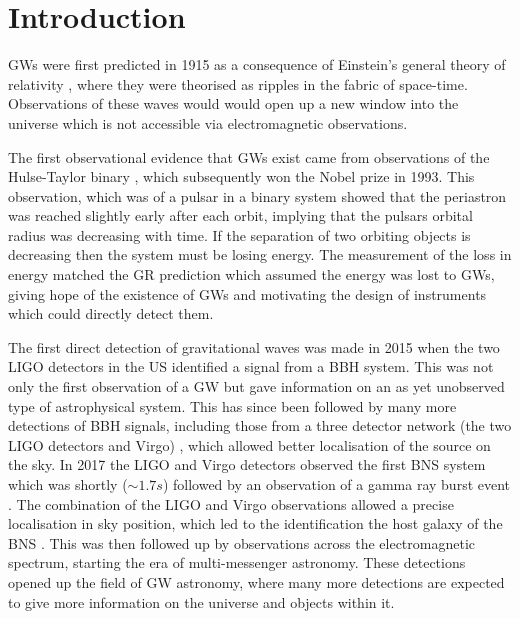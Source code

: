 \chapter{\label{intro}Introduction}


\Glspl{GW} were first predicted in 1915 as a consequence of Einstein's general
theory of relativity \citep{einstein2005GrundlageAllgemeinen}, where they were
theorised as ripples in the fabric of space-time.  Observations of these waves would would open up a new window into the universe which is not accessible via electromagnetic observations.  

The first observational evidence that \glspl{GW} exist came from observations of the Hulse-Taylor
binary \citep{weisberg1981GravitationalWaves,weisberg2004RelativisticBinary}, which subsequently won the Nobel prize in 1993.
This observation, which was of a pulsar in a binary system showed that the periastron was
reached slightly early after each orbit, implying that the pulsars orbital radius was
decreasing with time.  If the separation of two orbiting objects is decreasing
then the system must be losing energy.  The measurement of the loss in energy matched the \gls{GR}
prediction which assumed the energy was lost to \glspl{GW}, giving hope of
the existence of \glspl{GW} and motivating the design of instruments
which could directly detect them.

The first direct detection of gravitational
waves was made in 2015 when the two \gls{LIGO} detectors in the US
\citep{abbott2016ObservationGravitational} identified a signal from a \gls{BBH}
system.  This was not only the first observation of a \gls{GW} but gave
information on an as yet unobserved type of astrophysical
system.  This has since been followed by many more detections of \gls{BBH}
signals, including those from a three detector network (the two \gls{LIGO} detectors and Virgo)
\citep{abbott2017GW170814ThreeDetector,theligoscientificcollaboration2020GW190425Observation}, which allowed better localisation of the source on the sky.  
In 2017 the \gls{LIGO} and Virgo detectors observed the
first \gls{BNS} system \citep{abbott2017GW170817Observation} which was shortly ($\sim 1.7s$) followed by an observation of a gamma ray burst event \citep{goldstein2017OrdinaryShort}.
The combination of the \gls{LIGO} and Virgo observations allowed a precise localisation in sky position, which led to the identification the host galaxy of the \gls{BNS} \citep{coulter2017SwopeSupernova}.
This was then followed up by observations across the electromagnetic spectrum, starting the era of multi-messenger astronomy.  
These detections opened up the field of
\gls{GW} astronomy, where many more detections are expected to give more
information on the universe and objects within it.

